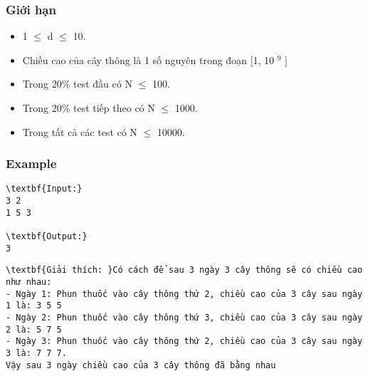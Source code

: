 \subsubsection{Giới hạn}
\begin{itemize}
	\item 1  $\le$  d  $\le$  10.
	\item Chiều cao của cây thông là 1 số nguyên trong đoạn [1, 10 $^ 9 $ ]
	\item Trong 20\% test đầu có N  $\le$  100.
	\item Trong 20\% test tiếp theo có N  $\le$  1000.
	\item Trong tất cả các test có N  $\le$  10000.
\end{itemize}

\subsubsection{Example}
\begin{verbatim}
\textbf{Input:}
3 2
1 5 3

\textbf{Output:}
3\end{verbatim}
\begin{verbatim}
\textbf{Giải thích: }Có cách để sau 3 ngày 3 cây thông sẽ có chiều cao như nhau:
- Ngày 1: Phun thuốc vào cây thông thứ 2, chiều cao của 3 cây sau ngày 1 là: 3 5 5
- Ngày 2: Phun thuốc vào cây thông thứ 3, chiều cao của 3 cây sau ngày 2 là: 5 7 5
- Ngày 3: Phun thuốc vào cây thông thứ 2, chiều cao của 3 cây sau ngày 3 là: 7 7 7.
Vậy sau 3 ngày chiều cao của 3 cây thông đã bằng nhau\end{verbatim}
